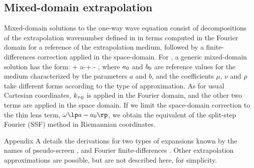 \subsection{Mixed-domain extrapolation}
Mixed-domain solutions to the one-way wave equation consist of
decompositions of the extrapolation wavenumber defined in
 in terms computed in the Fourier domain for a reference
of the extrapolation medium, followed by a finite-differences
correction applied in the space-domain. For , a generic
mixed-domain solution has the form:
%
\beq \label{eqn:rwemixed}
\kt \approx \kto + \ww \lp a-\ao \rp + 
                   \ww \frac{    \nu \yys }
                            {\mu-\ro \yys } \;,
\eeq
%
where $a_0$ and $b_0$ are reference values for the medium
characterized by the parameters $a$ and $b$, and the coefficients
$\mu$, $\nu$ and $\rho$ take different forms according to the type of
approximation. As for usual Cartesian coordinates, ${k_\tau}_0$ is applied
in the Fourier domain, and the other two terms are applied in the
space domain. If we limit the space-domain correction to the thin lens
term, $\ww \lp a-\ao \rp$, we obtain the equivalent of the split-step
Fourier (SSF) method \cite[]{GEO55-04-04100421} in Riemannian
coordinates.
%
\par
%
Appendix A details the derivations for two types of expansions known
by the names of pseudo-screen \cite[]{GEO64-05-15241534}, and Fourier
finite-differences \cite[]{GEO59-12-18821893,GEO67-03-08720882}. Other
extrapolation approximations are possible, but are not described here,
for simplicity.

